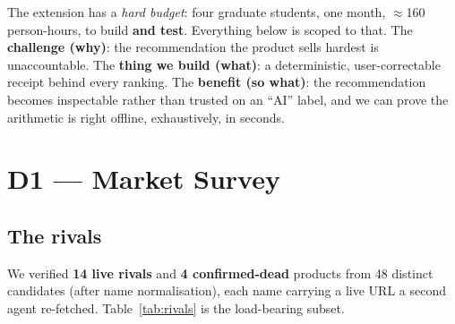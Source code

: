 \documentclass[sigconf,nonacm]{acmart}
\begin{document}
The extension has a \emph{hard budget}: four graduate students, one month,
$\approx$160 person-hours, to build \textbf{and test}. Everything below is scoped
to that. The \textbf{challenge (why)}: the recommendation the product sells hardest
is unaccountable. The \textbf{thing we build (what)}: a deterministic,
user-correctable receipt behind every ranking. The \textbf{benefit (so what)}: the
recommendation becomes inspectable rather than trusted on an ``AI'' label, and we
can prove the arithmetic is right offline, exhaustively, in seconds.

\section{D1 --- Market Survey}
\subsection{The rivals}
We verified \textbf{14 live rivals} and \textbf{4 confirmed-dead} products from 48
distinct candidates (after name normalisation), each name carrying a live URL a
second agent re-fetched. Table~\ref{tab:rivals} is the load-bearing subset.
\end{document}
